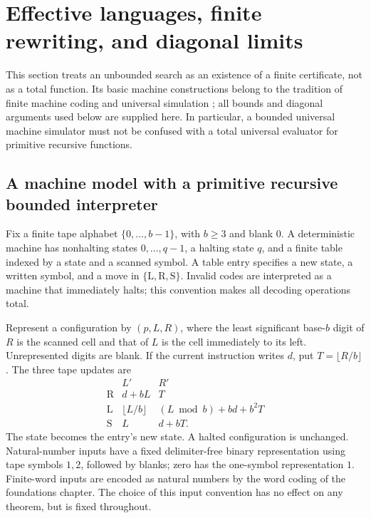 \section{Effective languages, finite rewriting, and diagonal limits}
\label{sec:effective}

This section treats an unbounded search as an existence of a finite certificate,
not as a total function.  Its basic machine constructions belong to the tradition
of finite machine coding and universal simulation \cite{Turing1936}; all bounds
and diagonal arguments used below are supplied here.  In particular, a bounded
universal machine simulator must not be confused with a total universal
evaluator for primitive recursive functions.

\subsection{A machine model with a primitive recursive bounded interpreter}

Fix a finite tape alphabet $\{0,\ldots,b-1\}$, with $b\geq3$ and blank $0$.
A deterministic machine has nonhalting states $0,\ldots,q-1$, a halting state
$q$, and a finite table indexed by a state and a scanned symbol.  A table entry
specifies a new state, a written symbol, and a move in $\{\mathrm L,
\mathrm R,\mathrm S\}$.  Invalid codes are interpreted as a machine that
immediately halts; this convention makes all decoding operations total.

Represent a configuration by $(p,L,R)$, where the least significant base-$b$
digit of $R$ is the scanned cell and that of $L$ is the cell immediately to its
left.  Unrepresented digits are blank.  If the current instruction writes $d$,
put $T=\lfloor R/b\rfloor$.  The three tape updates are
\[
\begin{array}{c|cc}
 &L'&R'\\ \hline
\mathrm R&d+bL&T\\
\mathrm L&\lfloor L/b\rfloor&(L\bmod b)+bd+b^2T\\
\mathrm S&L&d+bT.
\end{array}
\]
The state becomes the entry's new state.  A halted configuration is unchanged.
Natural-number inputs have a fixed delimiter-free binary representation using
tape symbols $1,2$, followed by blanks; zero has the one-symbol representation
$1$.  Finite-word inputs are encoded as natural numbers by the word coding of
the foundations chapter.  The choice of this input convention has no effect
on any theorem, but is fixed throughout.


